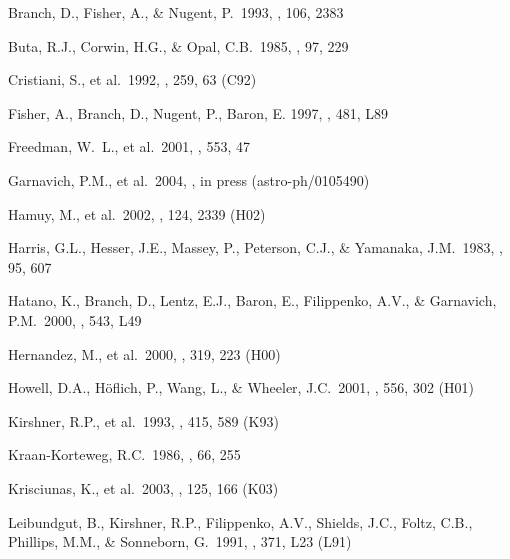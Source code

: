 \documentclass[preprint2]{aastex}
\begin{document}
\begin{thebibliography}{}
 Branch, D., 
Fisher, A., \& Nugent, P.\ 1993, \aj, 106, 2383 

%
 Buta, R.J., 
Corwin, H.G., \& Opal, C.B.\ 1985, \pasp, 97, 229 

 Cristiani, S., et 
al.\ 1992, \aap, 259, 63 (C92)

 Fisher, A., Branch, D., Nugent, P., 
Baron, E. 1997, \apj, 481, L89 

 Freedman, W.~L., et 
al.\ 2001, \apj, 553, 47 

 Garnavich, P.M., et al.\ 2004,
\apj, in press (astro-ph/0105490)

 Hamuy, M., et al.\ 2002, \aj, 124,
2339 (H02)

 Harris, G.L., Hesser, J.E., 
Massey, P., Peterson, C.J., \& Yamanaka, J.M.\ 1983, \pasp, 95, 607 

 Hatano, K., Branch, D., Lentz, E.J., 
Baron, E., Filippenko, A.V., \& Garnavich, P.M.\ 2000, \apjl, 543, L49 

 Hernandez, M., et 
al.\ 2000, \mnras, 319, 223 (H00)


Howell, D.A., H{\" o}flich, P., Wang, L., \& Wheeler, J.C.\ 2001, \apj, 
556, 302 (H01)
 
 Kirshner, R.P., et 
al.\ 1993, \apj, 415, 589 (K93)

 Kraan-Korteweg, R.C.\ 
1986, \aaps, 66, 255 

 Krisciunas, K., et 
al.\ 2003, \aj, 125, 166 (K03)

 Leibundgut, B., Kirshner, R.P., 
Filippenko, A.V., Shields, J.C., Foltz, C.B., Phillips, M.M., \& 
Sonneborn, G.\ 1991, \apjl, 371, L23 (L91)


\end{thebibliography}
\end{document}

